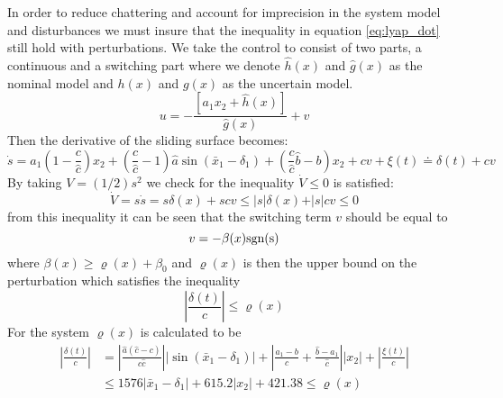 In order to reduce chattering and account for imprecision in the system model and disturbances we must insure that the inequality in equation \ref{eq:lyap_dot} still hold with perturbations. We take the control to consist of two parts, a continuous and a switching part where we denote $\hat{h}(x)$ and $\hat{g}(x)$ as the nominal model and $h(x)$ and $g(x)$ as the uncertain model.
\begin{equation}
        u = - \frac{[a_1 x_2 + \hat{h}(x)]}{\hat{g}(x)} + v
\end{equation}
Then the derivative of the sliding surface becomes:
\begin{equation}
        \dot{s} = a_1\left(1 - \frac{c}{\hat{c}}\right) x_2 + \left(\frac{c}{\hat{c}} - 1\right)\hat{a} \sin (\bar{x}_1 - \delta_1) + \left(\frac{c}{\hat{c}}\hat{b} - b\right) x_2 + cv + \xi(t) \doteq \delta(t) + cv
\end{equation}
By taking $V = (1/2) s^2$ we check for the inequality $\dot{V} \leq 0$ is satisfied:
\begin{equation}
        \dot{V} = s\dot{s} = s\delta(x) + scv \leq \vert s \vert \delta(x) + \vert s \vert c v \leq 0
\end{equation}
from this inequality it can be seen that the switching term $v$ should be equal to
\begin{equation}
        v = -\beta(x)\mathrm{sgn(s)}
\end{equation}
where $\beta(x) \geq \varrho(x) + \beta_0$ and $\varrho(x)$ is then the upper bound on the perturbation which satisfies the inequality
\begin{equation}
        \left \vert \frac{\delta(t)}{c} \right\vert \leq \varrho(x)
\end{equation}
For the system $\varrho(x)$ is calculated to be
\begin{equation}
        \begin{split}
                \left \vert \frac{\delta(t)}{c} \right\vert &= \left \vert \frac{\hat{a}(\hat{c}-c)}{c\hat{c}} \right \vert \vert \sin (\bar{x}_1 - \delta_1) \vert + \left \vert \frac{a_1 - b}{c} + \frac{\hat{b} - a_1}{\hat{c}} \right \vert \vert x_2 \vert + \left\vert \frac{\xi(t)}{c}\right\vert \\
                &\leq 1576 \vert \bar{x}_1-\delta_1 \vert + 615.2\vert x_2 \vert + 421.38  \leq \varrho(x)
        \end{split}
\end{equation}
